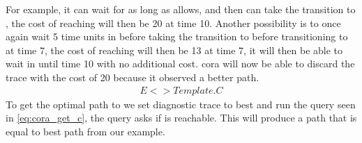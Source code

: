 For example, it can wait for as long as  allows, and then can take the transition to , the cost of reaching  will then be 20 at time 10.
Another possibility is to once again wait 5 time units in  before taking the transition to  before transitioning to  at time 7, the cost of reaching  will then be 13 at time 7, it will then be able to wait in  until time 10 with no additional cost.
\gls{cora} will now be able to discard the trace with the cost of 20 because it observed a better path.
\begin{align}
E<> Template.C
\label{eq:cora_get_c}
\end{align}
To get the optimal path to  we set diagnostic trace to best and run the query seen in \ref{eq:cora_get_c}, the query asks if  is reachable.
This will produce a path that is equal to best path from our example.
